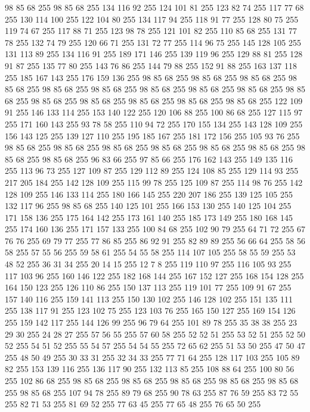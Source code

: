 98 85 68 255 98 85 68 255 134 116 92 255 124 101 81 255 123 82 74 255 117 77 68 255 130 114 100 255 122 104 80 255 134 117 94 255 118 91 77 255 128 80 75 255 119 74 67 255 117 88 71 255 123 98 78 255 121 101 82 255 110 85 68 255 131 77 78 255 132 74 79 255 120 66 71 255 131 72 77 255 114 96 75 255 145 128 105 255 131 113 89 255 134 116 91 255 189 171 146 255 139 119 96 255 129 88 81 255 128 91 87 255 135 77 80 255 143 76 86 255 144 79 88 255 152 91 88 255 163 137 118 255 185 167 143 255 176 159 136 255 98 85 68 255 98 85 68 255 98 85 68 255 98 85 68 255 98 85 68 255 98 85 68 255 98 85 68 255 98 85 68 255 98 85 68 255 98 85 68 255 98 85 68 255 98 85 68 255 98 85 68 255 98 85 68 255 98 85 68 255 122 109 91 255 146 133 114 255 153 140 122 255 120 106 88 255 100 86 68 255 127 115 97 255 171 160 143 255 93 78 58 255 110 94 72 255 170 155 134 255 143 128 109 255 156 143 125 255 139 127 110 255 195 185 167 255
181 172 156 255 105 93 76 255 98 85 68 255 98 85 68 255 98 85 68 255 98 85 68 255 98 85 68 255 98 85 68 255 98 85 68 255 98 85 68 255 96 83 66 255 97 85 66 255 176 162 143 255 149 135 116 255 113 96 73 255 127 109 87 255 129 112 89 255 124 108 85 255 129 114 93 255 217 205 184 255 142 128 109 255 115 99 78 255 125 109 87 255 114 98 76 255 142 128 109 255 146 133 114 255 180 166 145 255 220 207 186 255 139 125 105 255 132 117 96 255 98 85 68 255 140 125 101 255 166 153 130 255 140 125 104 255 171 158 136 255 175 164 142 255 173 161 140 255 185 173 149 255 180 168 145 255 174 160 136 255 171 157 133 255 100 84 68 255 102 90 79 255 64 71 72 255 67 76 76 255 69 79 77 255 77 86 85 255 86 92 91 255 82 89 89 255 56 66 64 255 58 56 58 255 57 55 56 255 59 58 61 255 54 55 58 255 114 107 105 255 58 55 59 255 53 48 52 255 36 31 34 255 20 14 15 255 12 7 8 255 119 110 97 255 116 105 93 255 117 103 96 255 160 146 122 255
182 168 144 255 167 152 127 255 168 154 128 255 164 150 123 255 126 110 86 255 150 137 113 255 119 101 77 255 109 91 67 255 157 140 116 255 159 141 113 255 150 130 102 255 146 128 102 255 151 135 111 255 138 117 91 255 123 102 75 255 123 103 76 255 165 150 127 255 169 154 126 255 159 142 117 255 144 126 99 255 96 79 64 255 101 89 78 255 35 38 38 255 23 29 30 255 24 28 27 255 57 56 55 255 57 60 58 255 52 52 51 255 53 52 51 255 52 50 52 255 54 51 52 255 55 54 57 255 54 54 55 255 72 65 62 255 51 53 50 255 47 50 47 255 48 50 49 255 30 33 31 255 32 34 33 255 77 71 64 255 128 117 103 255 105 89 82 255 153 139 116 255 136 117 90 255 132 113 85 255 108 88 64 255 100 80 56 255 102 86 68 255 98 85 68 255 98 85 68 255 98 85 68 255 98 85 68 255 98 85 68 255 98 85 68 255 107 94 78 255 89 79 68 255 90 78 63 255 87 76 59 255 83 72 55 255 82 71 53 255 81 69 52 255 77 63 45 255 77 65 48 255 76 65 50 255
